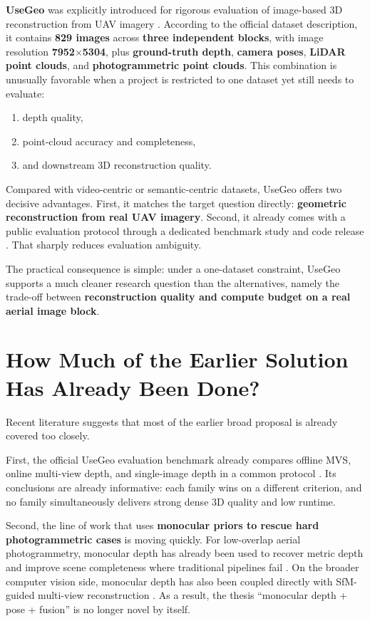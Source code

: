 \documentclass[11pt,a4paper]{article}
\begin{document}
\textbf{UseGeo} was explicitly introduced for rigorous evaluation of image-based 3D reconstruction from UAV imagery \citep{Nex2024UseGeo}. According to the official dataset description, it contains \textbf{829 images} across \textbf{three independent blocks}, with image resolution \textbf{7952$\times$5304}, plus \textbf{ground-truth depth}, \textbf{camera poses}, \textbf{LiDAR point clouds}, and \textbf{photogrammetric point clouds}. This combination is unusually favorable when a project is restricted to one dataset yet still needs to evaluate:
\begin{enumerate}[leftmargin=1.5em]
  \item depth quality,
  \item point-cloud accuracy and completeness,
  \item and downstream 3D reconstruction quality.
\end{enumerate}

Compared with video-centric or semantic-centric datasets, UseGeo offers two decisive advantages. First, it matches the target question directly: \textbf{geometric reconstruction from real UAV imagery}. Second, it already comes with a public evaluation protocol through a dedicated benchmark study and code release \citep{Hermann2024UseGeoEval}. That sharply reduces evaluation ambiguity.

The practical consequence is simple: under a one-dataset constraint, UseGeo supports a much cleaner research question than the alternatives, namely the trade-off between \textbf{reconstruction quality and compute budget on a real aerial image block}.

\section{How Much of the Earlier Solution Has Already Been Done?}

Recent literature suggests that most of the earlier broad proposal is already covered too closely.

First, the official UseGeo evaluation benchmark already compares offline MVS, online multi-view depth, and single-image depth in a common protocol \citep{Hermann2024UseGeoEval}. Its conclusions are already informative: each family wins on a different criterion, and no family simultaneously delivers strong dense 3D quality and low runtime.

Second, the line of work that uses \textbf{monocular priors to rescue hard photogrammetric cases} is moving quickly. For low-overlap aerial photogrammetry, monocular depth has already been used to recover metric depth and improve scene completeness where traditional pipelines fail \citep{Zhong2025LowOverlap}. On the broader computer vision side, monocular depth has also been coupled directly with SfM-guided multi-view reconstruction \citep{Guo2025SfMGuided}. As a result, the thesis ``monocular depth + pose + fusion'' is no longer novel by itself.
\end{document}
